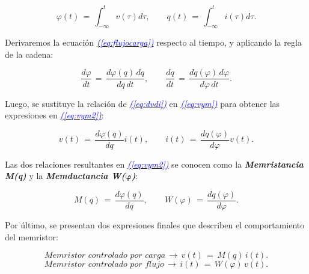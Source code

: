 \documentclass[12pt,a4paper]{report} %
\newcommand{\eref}[1]{\hyperref[#1]{\textcolor{blue}{\textit{(\ref*{#1})}}}}
\begin{document}
	\begin{equation}
		\varphi(t)\,=\,\int_{-\infty}^{t}v(\tau)d\tau, \qquad q(t)\,=\,\int_{-\infty}^{t}i(\tau)d\tau.
		\label{eq:flujocargaintegral}
	\end{equation}\smallskip
	
	\noindent Derivaremos la ecuación \eref{eq:flujocarga} respecto al tiempo, y aplicando la regla de la cadena:
	
	\begin{equation}
		\frac{d\varphi}{dt}\,=\,\frac{d\varphi(q)\,dq}{dq\,dt}, \qquad \frac{dq}{dt}\,=\,\frac{dq(\varphi)\,d\varphi}{d\varphi\,dt}.
		\label{eq:vym}
	\end{equation}\smallskip
	
	\vspace{0.5cm}\noindent Luego, se sustituye la relación de \eref{eq:dvdi} en \eref{eq:vym} para obtener las expresiones en \eref{eq:vym2}:
	
	\begin{equation}
		v(t)\,=\,\frac{d\varphi(q)}{dq}i(t), \qquad i(t)\,=\,\frac{dq(\varphi)}{d\varphi}v(t).
		\label{eq:vym2}
	\end{equation}\smallskip
	
	\vspace{0.5cm}\noindent Las dos relaciones resultantes en \eref{eq:vym2} se conocen como la \textbf{\textit{Memristancia M(q)}} y la \textbf{\textit{Memductancia W($\bm{\varphi}$)}}:
	
	\begin{equation}
		M(q)\,=\,\frac{d\varphi(q)}{dq}, \qquad W(\varphi)\,=\,\frac{dq(\varphi)}{d\varphi}.
		\label{eq:myw}
	\end{equation}\smallskip
	
	\vspace{0.5cm}\noindent Por último, se presentan dos expresiones finales que describen el comportamiento del memristor:
	
	\begin{equation}
		\textit{Memristor controlado por carga} \, \rightarrow \, v(t)\,=\,M(q)\,i(t).
		\label{eq:cc}
	\end{equation}\smallskip
	\begin{equation}
		\textit{Memristor controlado por flujo} \, \rightarrow \, i(t)\,=\,W(\varphi)\,v(t).
		\label{eq:fc}
	\end{equation}\smallskip

	
	
	\newpage
	
\end{document}
